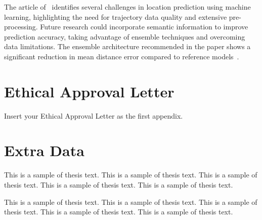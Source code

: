 \documentclass[12pt,oneside]{book} %
\begin{document}
The article of~\citet{MLTechniqueFPP} identifies several challenges in location
prediction using machine learning, highlighting the need for trajectory data
quality and extensive pre-processing. Future research could incorporate
semantic information to improve prediction accuracy, taking advantage of
ensemble techniques and overcoming data limitations. The ensemble architecture
recommended in the paper shows a significant reduction in mean distance error
compared to reference models~\cite{MLTechniqueFPP}.

%




\appendix
\chapter{Ethical Approval Letter}
Insert your Ethical Approval Letter as the first appendix.

\chapter{Extra Data}
This is a sample of thesis text. This is a sample of thesis text. This is a
sample of thesis text. This is a sample of thesis text. This is a sample of
thesis text.

This is a sample of thesis text. This is a sample of thesis text. This is a
sample of thesis text. This is a sample of thesis text. This is a sample of
thesis text.
\end{document}
